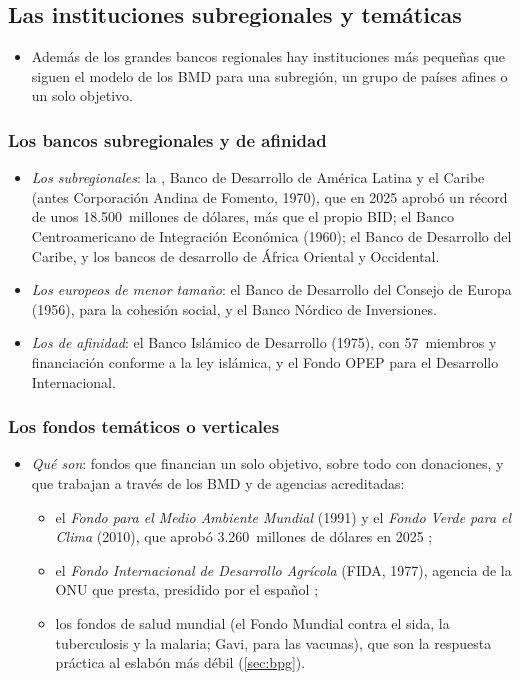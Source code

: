 \documentclass[11pt]{article}
\begin{document}
\subsection{Las instituciones subregionales y temáticas}\label{sec:otras}

\begin{itemize}
\item Además de los grandes bancos regionales hay instituciones más pequeñas que siguen el modelo de los BMD para una subregión, un grupo de países afines o un solo objetivo.
\end{itemize}

\subsubsection{Los bancos subregionales y de afinidad}\label{sec:subregionales}

\begin{itemize}
\item \emph{Los subregionales}: la , Banco de Desarrollo de América Latina y el Caribe (antes Corporación Andina de Fomento, 1970), que en 2025 aprobó un récord de unos 18.500~millones de dólares, más que el propio BID\nocite{CAF2026Estados}; el Banco Centroamericano de Integración Económica (1960); el Banco de Desarrollo del Caribe, y los bancos de desarrollo de África Oriental y Occidental.
\item \emph{Los europeos de menor tamaño}: el Banco de Desarrollo del Consejo de Europa (1956), para la cohesión social, y el Banco Nórdico de Inversiones.
\item \emph{Los de afinidad}: el Banco Islámico de Desarrollo (1975), con 57~miembros y financiación conforme a la ley islámica, y el Fondo OPEP para el Desarrollo Internacional.
\end{itemize}

\subsubsection{Los fondos temáticos o verticales}\label{sec:verticales}

\begin{itemize}
\item \emph{Qué son}: fondos que financian un solo objetivo, sobre todo con donaciones, y que trabajan a través de los BMD y de agencias acreditadas:
  \begin{itemize}
  \item el \emph{Fondo para el Medio Ambiente Mundial} (1991) y el \emph{Fondo Verde para el Clima} (2010), que aprobó 3.260~millones de dólares en 2025 ;
  \item el \emph{Fondo Internacional de Desarrollo Agrícola} (FIDA, 1977), agencia de la ONU que presta, presidido por el español ;
  \item los fondos de salud mundial (el Fondo Mundial contra el sida, la tuberculosis y la malaria; Gavi, para las vacunas), que son la respuesta práctica al eslabón más débil (\ref{sec:bpg}).
  \end{itemize}
\end{itemize}
\end{document}
